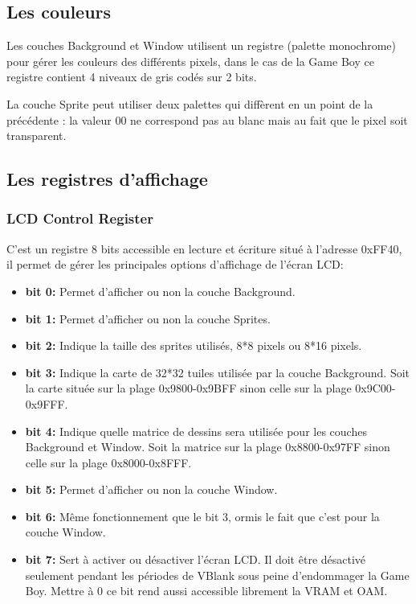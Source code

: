 \documentclass[french]{report}
\begin{document}
\subsection{Les couleurs}

Les couches Background et Window utilisent un registre (palette monochrome) pour gérer les
couleurs des différents pixels, dans le cas de la Game Boy ce registre contient
4 niveaux de gris codés sur 2 bits.

La couche Sprite peut utiliser deux palettes qui diffèrent en un point de la précédente : la valeur 00 ne correspond pas au blanc mais au fait que
le pixel soit transparent.\\

\subsection{Les registres d'affichage}
\subsubsection{LCD Control Register}
C'est un registre 8 bits accessible en lecture et écriture situé à l'adresse 0xFF40, il permet de gérer les principales options d'affichage de l'écran LCD:\\

\begin{itemize}
\item \textbf{bit 0:}
	Permet d'afficher ou non la couche Background.\\
\item \textbf{bit 1:}
	Permet d'afficher ou non la couche Sprites.\\
\item \textbf{bit 2:}
	Indique la taille des sprites utilisés, 8*8 pixels ou 8*16 pixels.\\
\item \textbf{bit 3:}
	Indique la carte de 32*32 tuiles utilisée par la couche Background. Soit la carte située sur la plage 0x9800-0x9BFF sinon celle sur la plage 0x9C00-0x9FFF.\\
\item \textbf{bit 4:}
	Indique quelle matrice de dessins sera utilisée pour les couches Background et Window. Soit la matrice sur la plage 0x8800-0x97FF sinon celle sur la plage 0x8000-0x8FFF.\\
\item \textbf{bit 5:}
	Permet d'afficher ou non la couche Window.\\
\item \textbf{bit 6:}
	Même fonctionnement que le bit 3, ormis le fait que c'est pour la couche Window.\\
\item \textbf{bit 7:}
	Sert à activer ou désactiver l'écran LCD. Il doit être désactivé seulement pendant les périodes de VBlank sous peine d'endommager la Game Boy. Mettre à 0 ce bit rend aussi accessible librement la VRAM et OAM.\\
\end{itemize}
\end{document}
